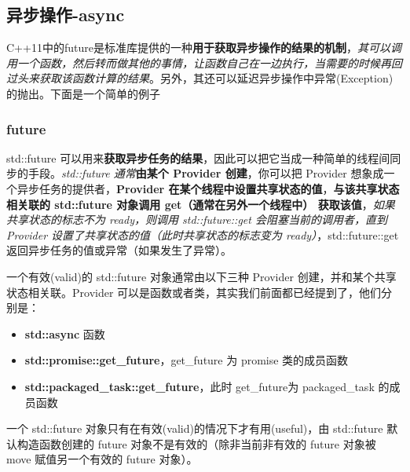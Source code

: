 \documentclass[UTF8,a4paper,12pt]{ctexbook}
\begin{document}
	\subsection{异步操作-async}
		C++11中的future是标准库提供的一种\textbf{用于获取异步操作的结果的机制}，\textit{其可以调用一个函数，然后转而做其他的事情，让函数自己在一边执行，当需要的时候再回过头来获取该函数计算的结果}。另外，其还可以延迟异步操作中异常(Exception)的抛出。下面是一个简单的例子
		
		\subsubsection{future}
			std::future 可以用来\textbf{获取异步任务的结果}，因此可以把它当成一种简单的线程间同步的手段。\textit{std::future 通常}\textbf{由某个 Provider 创建}，你可以把 Provider 想象成一个异步任务的提供者，\textbf{Provider 在某个线程中设置共享状态的值}，\textbf{与该共享状态相关联的 std::future 对象调用 get（通常在另外一个线程中） 获取该值}，\textit{如果共享状态的标志不为 ready，则调用 std::future::get 会阻塞当前的调用者，直到 Provider 设置了共享状态的值（此时共享状态的标志变为 ready）}，std::future::get 返回异步任务的值或异常（如果发生了异常）。
			
			一个有效(valid)的 std::future 对象通常由以下三种 Provider 创建，并和某个共享状态相关联。Provider 可以是函数或者类，其实我们前面都已经提到了，他们分别是：
				\begin{itemize}
					\item \textbf{std::async} 函数
					\item \textbf{std::promise::get\_future}，get\_future 为 promise 类的成员函数
					\item \textbf{std::packaged\_task::get\_future}，此时 get\_future为 packaged\_task 的成员函数
				\end{itemize}

			一个 std::future 对象只有在有效(valid)的情况下才有用(useful)，由 std::future 默认构造函数创建的 future 对象不是有效的（除非当前非有效的 future 对象被 move 赋值另一个有效的 future 对象）。
			
\end{document}
